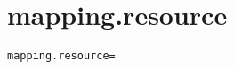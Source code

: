 \section{mapping.resource}
\label{configuration:MappingResource}
\AvailableInJavaOnly{\TODO}
\begin{lstlisting}[style=Props,caption={Usage example for \textit{mapping.resource}}]
mapping.resource=
\end{lstlisting}